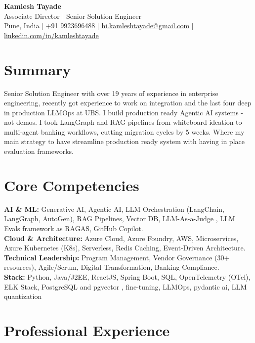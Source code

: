 \documentclass[10pt, letterpaper]{article}
\begin{document}
\begin{center}
    {\LARGE \textbf{Kamlesh Tayade}} \\Associate Director | Senior Solution Engineer \\
    Pune, India | +91 9923696488 | \href{mailto:hi.kamleshtayade@gmail.com}{hi.kamleshtayade@gmail.com} |
    \href{https://www.linkedin.com/in/kamleshtayade}{linkedin.com/in/kamleshtayade}
\end{center}

\section{Summary}
Senior Solution Engineer with over 19 years of experience in enterprise engineering, recently got experience to work on integration and the last four deep in production LLMOps at UBS. I build production ready Agentic AI systems -not demos. I took LangGraph and RAG pipelines from whiteboard ideation to multi-agent banking workflows, cutting migration cycles by 5 weeks. Where my main strategy to have streamline production ready system with having in place evaluation frameworks. 

\section{Core Competencies}
\textbf{AI \& ML:} Generative AI,  Agentic AI, LLM Orchestration (LangChain, LangGraph, AutoGen), RAG Pipelines, Vector DB, LLM-As-a-Judge , LLM Evals framework as RAGAS, GitHub Copilot. \\
\textbf{Cloud \& Architecture:} Azure Cloud, Azure Foundry, AWS, Microservices, Azure Kubernetes (K8s), Serverless, Redis Caching, Event-Driven Architecture. \\
\textbf{Technical Leadership:} Program Management, Vendor Governance (30+ resources), Agile/Scrum, Digital Transformation, Banking Compliance. \\
\textbf{Stack:} Python, Java/J2EE, ReactJS, Spring Boot, SQL, OpenTelemetry (OTel), ELK Stack, PostgreSQL and pgvector , fine-tuning, LLMOps,  pydantic ai, LLM quantization

\section{Professional Experience}
\end{document}
